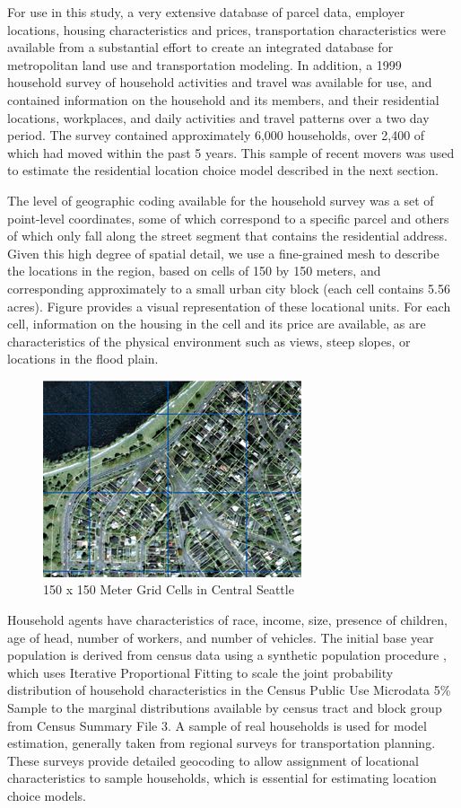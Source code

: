\documentclass[12pt,a4paper]{article}
\begin{document}
For use in this study, a very extensive database of parcel data,
employer locations, housing characteristics and prices,
transportation characteristics were available from a substantial
effort to create an integrated database for metropolitan land use
and transportation modeling.  In addition, a 1999 household survey
of household activities and travel was available for use, and
contained information on the household and its members, and their
residential locations, workplaces, and daily activities and travel
patterns over a two day period.  The survey contained
approximately 6,000 households, over 2,400 of which had moved
within the past 5 years.  This sample of recent movers was used to
estimate the residential location choice model described in the
next section.

The level of geographic coding available for the household survey
was a set of point-level coordinates, some of which correspond to
a specific parcel and others of which only fall along the street
segment that contains the residential address.  Given this high
degree of spatial detail, we use a fine-grained mesh to describe
the locations in the region, based on cells of 150 by 150 meters,
and corresponding approximately to a small urban city block (each
cell contains 5.56 acres).  Figure \label{gridmap} provides a
visual representation of these locational units.  For each cell,
information on the housing in the cell and its price are
available, as are characteristics of the physical environment such
as views, steep slopes, or locations in the flood plain.

\begin{figure}[h]
\centerline{
  \includegraphics[width=.45\textwidth,height=0.35\textwidth]
 {gridmap-small.png}}
\caption{\label{fig:gridmap} 150 x 150 Meter Grid Cells in Central
Seattle}
\end{figure}

Household agents have characteristics of race, income, size,
presence of children, age of head, number of workers, and number of
vehicles. The initial base year population is derived from census
data using a synthetic population procedure \cite{beckman-1996},
which uses Iterative Proportional Fitting to scale the joint
probability distribution of household characteristics in the Census
Public Use Microdata 5\% Sample to the marginal distributions
available by census tract and block group from Census Summary File
3. A sample of real households is used for model estimation,
generally taken from regional surveys for transportation planning.
These surveys provide detailed geocoding to allow assignment of
locational characteristics to sample households, which is essential
for estimating location choice models.
\end{document}
